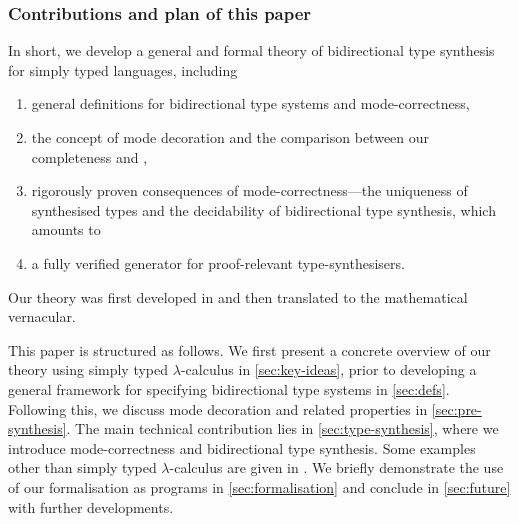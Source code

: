 \subsubsection{Contributions and plan of this paper}

%
In short, we develop a general and formal theory of bidirectional type synthesis for simply typed languages, including 
\begin{enumerate}
  \item general definitions for bidirectional type systems and mode-correctness,
  \item the concept of mode decoration and the comparison between our completeness and , 
  \item rigorously proven consequences of mode-correctness---the uniqueness of synthesised types and the decidability of bidirectional type synthesis, which amounts to
  \item a fully verified generator for proof-relevant type-synthesisers.
\end{enumerate}
Our theory was first developed in \Agda and then translated to the mathematical vernacular.


This paper is structured as follows.
We first present a concrete overview of our theory using simply typed $\lambda$-calculus in \cref{sec:key-ideas}, prior to developing a general framework for specifying bidirectional type systems in \cref{sec:defs}.
Following this, we discuss mode decoration and related properties in \cref{sec:pre-synthesis}.
The main technical contribution lies in \cref{sec:type-synthesis}, where we introduce mode-correctness and bidirectional type synthesis.
Some examples other than simply typed $\lambda$-calculus are given in .
We briefly demonstrate the use of our \Agda formalisation as programs in \cref{sec:formalisation} and conclude in \cref{sec:future} with further developments.


